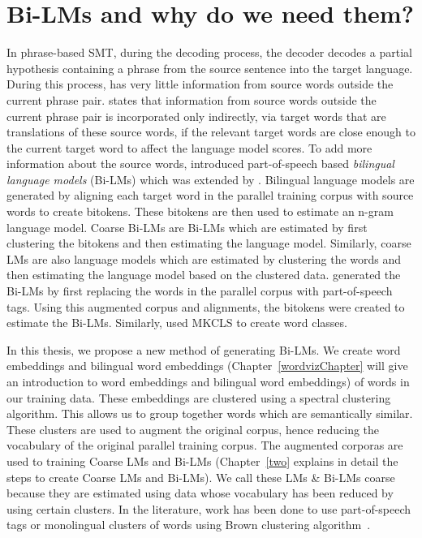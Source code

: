\section{Bi-LMs and why do we need them?}\label{intro-bilm}
In phrase-based SMT, during the decoding process, the decoder decodes a partial hypothesis containing a phrase from the source sentence into the target language. During this process, has very little information from source words outside the current phrase pair. \cite{Stewart2014} states that information from source words outside the current phrase pair is incorporated only indirectly, via target words that are translations of these source words, if the relevant target words are close enough to the current target word to affect the language model scores. To add more information about the source words, \cite{Niehues2011} introduced part-of-speech based \textit{bilingual language models} (Bi-LMs) which was extended by \cite{Stewart2014}. Bilingual language models are generated by aligning each target word in the parallel training corpus with source words to create bitokens. These bitokens are then used to estimate an n-gram language model. Coarse Bi-LMs are Bi-LMs which are estimated by first clustering the bitokens and then estimating the language model. Similarly, coarse LMs are also language models which are estimated by clustering the words and then estimating the language model based on the clustered data. \cite{Niehues2011} generated the Bi-LMs by first replacing the words in the parallel corpus with part-of-speech tags. Using this augmented corpus and alignments, the bitokens were created to estimate the Bi-LMs. Similarly, \cite{Stewart2014} used MKCLS \cite{Och1995} to create word classes. 

In this thesis, we propose a new method of generating Bi-LMs. We create word embeddings and bilingual word embeddings (Chapter~\ref{wordvizChapter} will give an introduction to word embeddings and bilingual word embeddings) of words in our training data. These embeddings are clustered using a spectral clustering algorithm. This allows us to group together words which are semantically similar. These clusters are used to augment the original corpus, hence reducing the vocabulary of the original parallel training corpus. The augmented corporas are used to training Coarse LMs and Bi-LMs (Chapter~\ref{two} explains in detail the steps to create Coarse LMs and Bi-LMs). We call these LMs \& Bi-LMs coarse because they are estimated using data whose vocabulary has been reduced by using certain clusters. In the literature, work has been done to use part-of-speech tags or monolingual clusters of words using Brown clustering algorithm~\cite{Brown1992}. 

